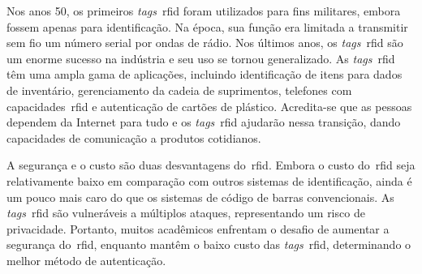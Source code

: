 Nos anos 50, os primeiros \textit{tags}~\acrshort{rfid} foram utilizados para
fins militares, embora fossem apenas para identificação.
Na época, sua função era limitada a transmitir sem fio um número serial
por ondas de rádio.
Nos últimos anos, os \textit{tags}~\acrshort{rfid} são um enorme sucesso na
indústria e seu uso se tornou generalizado.
As \textit{tags}~\acrshort{rfid} têm uma ampla gama de aplicações, incluindo
identificação de itens para dados de inventário, gerenciamento da cadeia de
suprimentos, telefones com capacidades~\acrshort{rfid} e autenticação de cartões
de plástico.
Acredita-se que as pessoas dependem da Internet para tudo e os \textit{tags}~\acrshort{rfid}
ajudarão nessa transição, dando capacidades de comunicação a produtos
cotidianos\cite{idrus2013}.

A segurança e o custo são duas desvantagens do~\acrshort{rfid}.
Embora o custo do~\acrshort{rfid} seja relativamente baixo em comparação com
outros sistemas de identificação, ainda é um pouco mais caro do que os sistemas
de código de barras convencionais.
As \textit{tags}~\acrshort{rfid} são vulneráveis a múltiplos ataques, representando
um risco de privacidade.
Portanto, muitos acadêmicos enfrentam o desafio de aumentar a segurança do~\acrshort{rfid},
enquanto mantêm o baixo custo das \textit{tags}~\acrshort{rfid}, determinando o
melhor método de autenticação\cite{jadhao2018}.